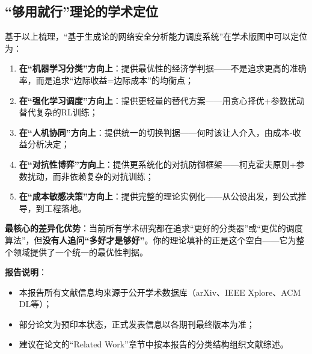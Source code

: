 \documentclass[11pt,a4paper]{article}
\begin{document}
\subsection*{“够用就行”理论的学术定位}

基于以上梳理，“基于生成论的网络安全分析能力调度系统”在学术版图中可以定位为：

\begin{enumerate}
    \item \textbf{在“机器学习分类”方向上}：提供最优性的经济学判据——不是追求更高的准确率，而是追求“边际收益=边际成本”的均衡点；
    \item \textbf{在“强化学习调度”方向上}：提供更轻量的替代方案——用贪心择优+参数扰动替代复杂的RL训练；
    \item \textbf{在“人机协同”方向上}：提供统一的切换判据——何时该让人介入，由成本-收益分析决定；
    \item \textbf{在“对抗性博弈”方向上}：提供更系统化的对抗防御框架——柯克霍夫原则+参数扰动，而非依赖复杂的对抗训练；
    \item \textbf{在“成本敏感决策”方向上}：提供完整的理论实例化——从公设出发，到公式推导，到工程落地。
\end{enumerate}

\textbf{最核心的差异化优势}：当前所有学术研究都在追求“更好的分类器”或“更优的调度算法”，但\textbf{没有人追问“多好才是够好”}。你的理论填补的正是这个空白——它为整个领域提供了一个统一的最优性判据。

\vspace{5mm}
\noindent\textbf{报告说明}：
\begin{itemize}
    \item 本报告所有文献信息均来源于公开学术数据库（arXiv、IEEE Xplore、ACM DL等）；
    \item 部分论文为预印本状态，正式发表信息以各期刊最终版本为准；
    \item 建议在论文的“Related Work”章节中按本报告的分类结构组织文献综述。
\end{itemize}
\end{document}
